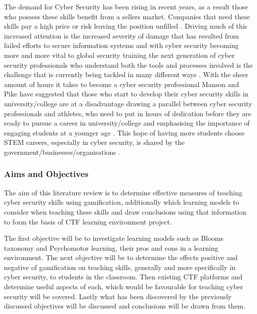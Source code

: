 \documentclass[12pt,a4paper]{article}
\begin{document}
The demand for Cyber Security has been rising in recent years, as a result those who possess these skills benefit from a sellers market. Companies that need these skills pay a high price or risk leaving the position unfilled \cite{libicki2014hackers}. Driving much of this increased attention is the increased severity of damage that has resulted from failed efforts to secure information systems \cite{albert2010high2} and with cyber security becoming more and more vital to global security \cite{nagarajan2012exploring6} training the next generation of cyber security professionals who understand both the tools and processes involved is the challenge that is currently being tackled in many different ways \cite{buchanan2011blending3}. With the sheer amount of hours it takes to become a cyber security professional Manson and Pike have suggested that those who start to develop their cyber security skills in university/college are at a disadvantage drawing a parallel between cyber security professionals and athletes, who need to put in hours of dedication before they are ready to pursue a career in university/college and emphasising the importance of engaging students at a younger age \cite{manson2014case}. This hope of having more students choose STEM careers, especially in cyber security, is shared by the government/businesses/organisations \cite{albert2010high4}. 

 
\subsubsection{Aims and Objectives}
The aim of this literature review is to determine effective measures of teaching cyber security skills using gamification, additionally which learning models to consider when teaching these skills and draw conclusions using that information to form the basis of CTF learning environment project. 


The first objective will be to investigate learning models such as Blooms taxonomy and Psychomotor learning, their pros and cons in a learning environment. The next objective will be to determine the effects positive and negative of gamification on teaching skills, generally and more specifically in cyber security, to students in the classroom. Then existing CTF platforms and determine useful aspects of each, which would be favourable for teaching cyber security will be covered. Lastly what has been discovered by the previously discussed objectives will be discussed and conclusions will be drawn from them.
\end{document}
